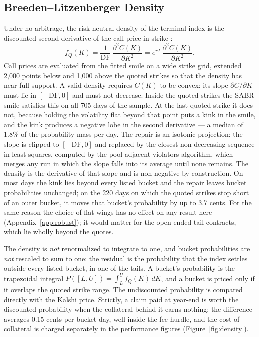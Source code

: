 \documentclass{article}
\begin{document}
\subsection{Breeden--Litzenberger Density}
Under no-arbitrage, the risk-neutral density of the terminal index is the discounted second derivative of the call price in strike \cite{Breeden1978}:
\[ f_Q(K) = \frac{1}{\mathrm{DF}}\,\frac{\partial^2 C(K)}{\partial K^2} = e^{rT}\,\frac{\partial^2 C(K)}{\partial K^2}. \]
Call prices are evaluated from the fitted smile on a wide strike grid, extended 2{,}000 points below and 1{,}000 above the quoted strikes so that the density has near-full support. A valid density requires $C(K)$ to be convex: its slope $\partial C/\partial K$ must lie in $[-\mathrm{DF}, 0]$ and must not decrease. Inside the quoted strikes the SABR smile satisfies this on all 705 days of the sample. At the last quoted strike it does not, because holding the volatility flat beyond that point puts a kink in the smile, and the kink produces a negative lobe in the second derivative --- a median of 1.8\% of the probability mass per day. The repair is an isotonic projection: the slope is clipped to $[-\mathrm{DF}, 0]$ and replaced by the closest non-decreasing sequence in least squares, computed by the pool-adjacent-violators algorithm, which merges any run in which the slope falls into its average until none remains. The density is the derivative of that slope and is non-negative by construction. On most days the kink lies beyond every listed bucket and the repair leaves bucket probabilities unchanged; on the 220 days on which the quoted strikes stop short of an outer bucket, it moves that bucket's probability by up to 3.7 cents. For the same reason the choice of flat wings has no effect on any result here (Appendix~\ref{app:robust}); it would matter for the open-ended tail contracts, which lie wholly beyond the quotes.

The density is \emph{not} renormalized to integrate to one, and bucket probabilities are \emph{not} rescaled to sum to one: the residual is the probability that the index settles outside every listed bucket, in one of the tails. A bucket's probability is the trapezoidal integral $P([L,U]) = \int_L^U f_Q(K)\,dK$, and a bucket is priced only if it overlaps the quoted strike range. The undiscounted probability is compared directly with the Kalshi price. Strictly, a claim paid at year-end is worth the discounted probability when the collateral behind it earns nothing; the difference averages 0.15 cents per bucket-day, well inside the fee hurdle, and the cost of collateral is charged separately in the performance figures (Figure~\ref{fig:density}).
\end{document}
